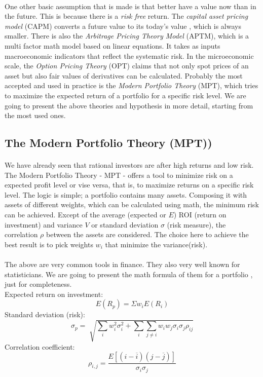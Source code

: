 \documentclass{article}
\begin{document}
\paragraph{ }
One other basic assumption that is made is that better have a value now than in the future. This is because there is a \emph{risk free} return. The \emph{capital asset pricing model} (CAPM) converts a future value to its today's value , which is always smaller. There is also the \emph{Arbitrage Pricing Theory Model} (APTM), which is a multi factor math model based on linear equations. It takes as inputs macroeconomic indicators that reflect the systematic risk. In the microeconomic scale, the \emph{Option Pricing Theory} (OPT) claims that not only spot prices of an asset but also fair values of derivatives can be calculated. Probably the most accepted and used in practice is the \emph{Modern Portfolio Theory} (MPT), which tries to maximize the expected return of a portfolio for a specific risk level. We are going to present the above theories and hypothesis in more detail, starting from the most used ones.

\subsection{The Modern Portfolio Theory (MPT))}
\paragraph{ }
We have already seen that rational investors are after high returns and low risk. The Modern Portfolio Theory - MPT - offers a tool to minimize risk on a expected profit level or vise versa, that is, to maximize returns on a specific risk level. The logic is simple; a portfolio contains many assets. Composing it with assets of different weights, which can be calculated using math, the minimum risk can be achieved. Except of the average (expected or $E$) ROI (return on investment) and variance $V$ or standard deviation $\sigma$ (risk measure), the correlation $\rho$ between the assets are considered. The choice here to achieve the best result is to pick weights $w_{i}$ that minimize the variance(risk).
\paragraph{ }
The above are very common tools in finance. They also very well known for statisticians. We are going to present the math formula of them for a portfolio , just for completeness.\\
Expected return on investment:
$$E(R_{p}) = \Sigma{w_{i}E(R_{i})}$$
Standard deviation (risk):
$$\sigma_{p} = \sqrt[]{\sum\limits_{i}{w_{i}^2\sigma_{i}^2}+\sum\limits_{i}\sum\limits_{j\neq i}w_{i}w_{j}\sigma_{i}\sigma_{j}\rho_{ij}}$$
Correlation coefficient:
$$\rho_{i,j} = \frac{E[(i-\overline{i})(j-\overline{j})]}{\sigma_{i}\sigma_{j}} $$
\end{document}
